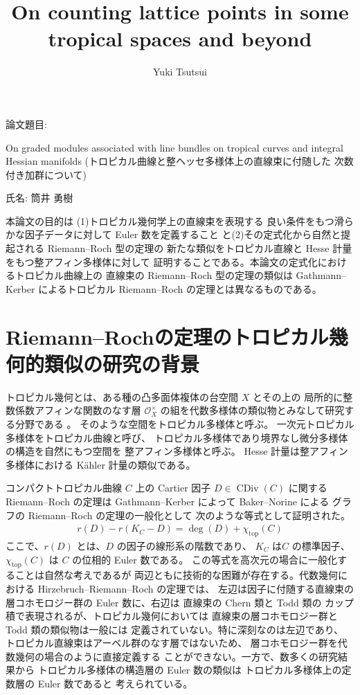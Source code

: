 \documentclass[a4paper,dvipdfmx,reqno,12pt]{amsart}
\title{On counting lattice points in some tropical spaces and beyond
}
\author[Y. Tsutsui]{Yuki Tsutsui}
\theoremstyle{definition}
\newcommand{\opn}[1]{\operatorname{#1}}
\numberwithin{equation}{section}
\begin{document}
論文題目:

On graded modules associated with line bundles on 
tropical curves and integral Hessian manifolds
(トロピカル曲線と整ヘッセ多様体上の直線束に付随した
次数付き加群について)

氏名: 筒井 勇樹

本論文の目的は (1)トロピカル幾何学上の直線束を表現する
良い条件をもつ滑らかな因子データに対して Euler 数を定義すること
と(2)その定式化から自然と提起される Riemann--Roch 型の定理の
新たな類似をトロピカル直線と Hesse 計量をもつ整アフィン多様体に対して
証明することである。本論文の定式化におけるトロピカル曲線上の
直線束の Riemann--Roch 型の定理の類似は Gathmann--Kerber
によるトロピカル Riemann--Roch の定理とは異なるものである。

\section{Riemann--Rochの定理のトロピカル幾何的類似の研究の背景}

トロピカル幾何とは、ある種の凸多面体複体の台空間 $X$ とその上の
局所的に整数係数アフィンな関数のなす層 
$\mathcal{O}_X^{\times}$
の組を代数多様体の類似物とみなして研究する分野である
\cite{mikhalkinTropicalEigenwaveIntermediate2014a,
gross2019sheaftheoretic}。
そのような空間をトロピカル多様体と呼ぶ。
一次元トロピカル多様体をトロピカル曲線と呼び、
トロピカル多様体であり境界なし微分多様体の構造を自然にもつ空間を
整アフィン多様体と呼ぶ。
Hesse 計量は整アフィン多様体における
K\"ahler 計量の類似である。

コンパクトトロピカル曲線 $C$ 上の Cartier 因子 
$D\in \opn{CDiv}(C)$
に関する Riemann--Roch の定理は
Gathmann--Kerber
\cite{gathmannRiemannRochTheoremTropical2008a} によって 
Baker--Norine \cite{MR2355607}による
グラフの Riemann--Roch の定理の一般化として
次のような等式として証明された。
\begin{align} \label{equation-tropical-rr}
r(D)-r(K_C-D)=\opn{deg}(D)+\chi_{\mathrm{top}}(C)
\end{align}
ここで、$r(D)$ とは、$D$ の因子の線形系の階数であり、
$K_C$ は$C$ の標準因子、$\chi_{\mathrm{top}}(C)$ は
$C$ の位相的 Euler 数である。
この等式を高次元の場合に一般化することは自然な考えであるが
両辺ともに技術的な困難が存在する。代数幾何における
Hirzebruch--Riemann--Roch の定理では、
左辺は因子に付随する直線束の層コホモロジー群の
Euler 数に、右辺は 直線束の Chern 類と Todd 類の
カップ積で表現されるが、トロピカル幾何においては
直線束の層コホモロジー群と Todd 類の類似物は一般には
定義されていない。特に深刻なのは左辺であり、
トロピカル直線束はアーベル群のなす層ではないため、
層コホモロジー群を代数幾何の場合のように直接定義する
ことができない。一方で、数多くの研究結果から
トロピカル多様体の構造層の Euler 数の類似は
トロピカル多様体上の定数層の Euler 数であると
考えられている。
\end{document}
